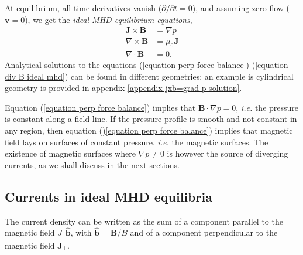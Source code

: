 \documentclass[my_thesis.tex]{subfiles}
\begin{document}
At equilibrium, all time derivatives vanish ($\partial/\partial t = 0$), and assuming zero flow ($\mathbf{v}=0$), we get the \emph{ideal MHD equilibrium equations},
\begin{align}
	\mathbf{J}\times\mathbf{B} &= \nabla p \label{equation perp force balance}\\
	\nabla\times\mathbf{B} &=\mu_0\mathbf{J}\\
	\nabla\cdot\mathbf{B}&=0.\label{equation div B ideal mhd}
\end{align}
Analytical solutions to the equations (\ref{equation perp force balance})-(\ref{equation div B ideal mhd}) can be found in different geometries; an example is cylindrical geometry is provided in appendix \ref{appendix jxb=grad p solution}.

Equation (\ref{equation perp force balance}) implies that $\mathbf{B}\cdot\nabla p=0$, \textit{i.e.} the pressure is constant along a field line. If the pressure profile is smooth and not constant in any region, then equation ()\ref{equation perp force balance}) implies that magnetic field lays on surfaces of constant pressure, \textit{i.e.} the magnetic surfaces. The existence of magnetic  surfaces where $\nabla p\neq 0$ is however the source of diverging currents, as we shall discuss in the next sections.



\subsection{Currents in ideal MHD equilibria}
The current density can be written as the sum of a component parallel to the magnetic field $J_\parallel \hat{\mathbf{b}}$, with $\hat{\mathbf{b}}=\mathbf{B}/B$ and of a component perpendicular to the magnetic field $\mathbf{J}_\perp$.
\end{document}
